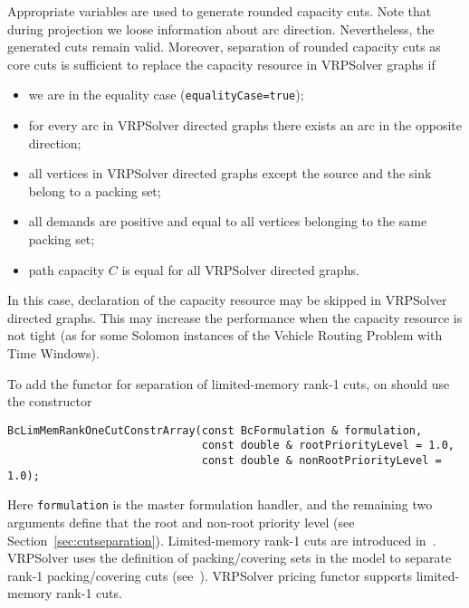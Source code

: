 \documentclass[10pt,a4paper]{article}
\begin{document}
Appropriate variables are used to generate rounded capacity cuts. Note that during projection we loose information about
arc direction. Nevertheless, the generated cuts remain valid. Moreover, separation of rounded capacity cuts as core cuts
is sufficient to replace the capacity resource in VRPSolver graphs if
\begin{itemize}
\item we are in the equality case (\verb+equalityCase=true+);  
\item for every arc in VRPSolver directed graphs there exists an arc in the opposite direction;
\item all vertices in VRPSolver directed graphs except the source and the sink belong to a packing set;
\item all demands are positive and equal to all vertices belonging to the same packing set;
\item path capacity $C$ is equal for all VRPSolver directed graphs.
\end{itemize}
In this case, declaration of the capacity resource may be skipped in VRPSolver directed graphs. This may increase the
performance when the capacity resource is not tight (as for some Solomon instances of the Vehicle Routing Problem with Time
Windows). 


\bigskip

To add the functor for separation of limited-memory rank-1 cuts, on should use the constructor
\begin{lstlisting}
BcLimMemRankOneCutConstrArray(const BcFormulation & formulation,
                              const double & rootPriorityLevel = 1.0,
                              const double & nonRootPriorityLevel = 1.0);
\end{lstlisting}
Here \verb+formulation+ is the master formulation handler, and the remaining two arguments define that the root and
non-root priority level (see Section~\ref{sec:cutseparation}). Limited-memory rank-1 cuts are introduced
in~\cite{PecinPessoaPoggi:17b}. VRPSolver uses the definition of packing/covering sets in the model to separate rank-1
packing/covering cuts (see~\cite{SadykovUchoaPessoa:21l}). VRPSolver pricing functor supports limited-memory rank-1
cuts. 
\end{document}
